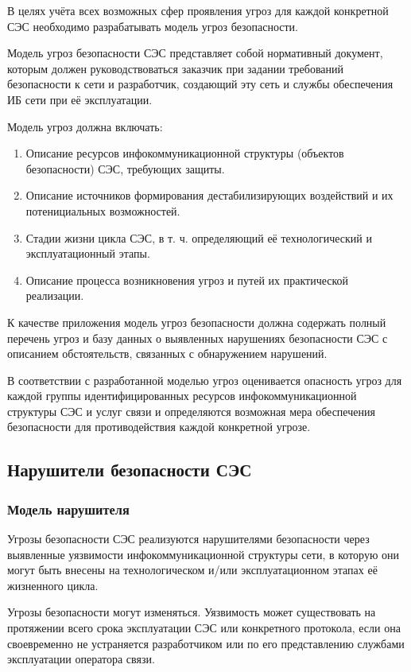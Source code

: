 \documentclass[12pt, russian, oneside, article]{ncc}
\begin{document}
В целях учёта всех возможных сфер проявления угроз для каждой конкретной СЭС необходимо разрабатывать модель угроз безопасности.

Модель угроз безопасности СЭС представляет собой нормативный документ, которым должен руководствоваться заказчик при задании требований безопасности к сети и разработчик, создающий эту сеть и службы обеспечения ИБ сети при её эксплуатации.

Модель угроз должна включать:
\begin{enumerate}
\item Описание ресурсов инфокоммуникационной структуры (объектов безопасности) СЭС, требующих защиты.
\item Описание источников формирования дестабилизирующих воздействий и их потенициальных возможностей.
\item Стадии жизни цикла СЭС, в т. ч. определяющий её технологический и эксплуатационный этапы.
\item Описание процесса возникновения угроз и путей их практической реализации.
\end{enumerate}

К качестве приложения модель угроз безопасности должна содержать полный перечень угроз и базу данных о выявленных нарушениях безопасности СЭС с описанием обстоятельств, связанных с обнаружением нарушений.

В соответствии с разработанной моделью угроз оценивается опасность угроз для каждой группы идентифицированных ресурсов инфокоммуникационной структуры СЭС и услуг связи и определяются возможная мера обеспечения безопасности для противодействия каждой конкретной угрозе.
\subsection{Нарушители безопасности СЭС}
\label{sec-1_2}
\subsubsection{Модель нарушителя}
\label{sec-1_2_1}


Угрозы безопасности СЭС реализуются нарушителями безопасности через выявленные уязвимости инфокоммуникационной структуры сети, в которую они могут быть внесены на технологическом и/или эксплуатационном этапах её жизненного цикла.

Угрозы безопасности могут изменяться. Уязвимость может существовать на протяжении всего срока эксплуатации СЭС или конкретного протокола, если она своевременно не устраняется разработчиком или по его представлению службами эксплуатации оператора связи.
\end{document}
